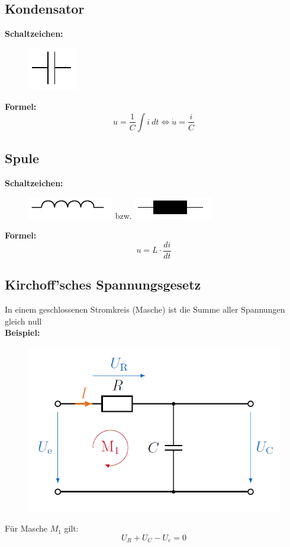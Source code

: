 \documentclass[10pt,a4paper]{article}
\begin{document}
\subsection{Kondensator}
\textbf{Schaltzeichen:} \\
\begin{figure}[H]
	\includegraphics[width=0.1\columnwidth]{imgs/kondensator.pdf}
\end{figure}
\textbf{Formel:}
$$
	u = \frac 1 C \int i ~dt \iff \dot u = \frac i C
$$

\subsection{Spule}
\textbf{Schaltzeichen:} \\
\begin{figure}[H]
	\includegraphics[width=0.1\columnwidth]{imgs/spule.pdf} bzw. 
	\includegraphics[width=0.1\columnwidth]{imgs/spule_alt.pdf}	
\end{figure}
\textbf{Formel:}
$$
	u = L ⋅ \frac{di}{dt}
$$

\subsection{Kirchoff'sches Spannungsgesetz}
In einem geschlossenen Stromkreis (Masche) ist die Summe aller Spannungen gleich null \\

\textbf{Beispiel:}
\begin{figure}[H]
	\includegraphics[width=0.5\columnwidth]{imgs/kvl.png}
\end{figure}
Für Masche $M_1$ gilt:
$$
U_R + U_C - U_e = 0
$$
\end{document}
